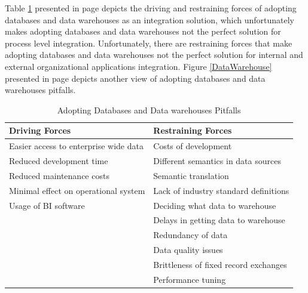 \documentclass[12pt,a4paper,final,twoside,onecolumn,titlepage]{book}
\begin{document}
Table \ref{MT3} presented in page \pageref{MT3} depicts the driving and restraining forces of adopting databases and data warehouses as an integration solution, which unfortunately makes adopting databases and data warehouses not the perfect solution for process level integration. Unfortunately, there are restraining forces that make adopting databases and data warehouses not the perfect solution for internal and external organizational applications integration. Figure \ref{DataWarehouse} presented in page \pageref{DataWarehouse} depicts another view of adopting databases and data warehouses pitfalls.

\begin{table}
\begin{center}
\caption{Adopting Databases and Data warehouses Pitfalls}
\begin{tabularx}{\textwidth}{|X|X|}
\hline Driving Forces & Restraining Forces \\
\hline Easier access to enterprise wide data & Costs of development \\
\hline Reduced development time & Different semantics in data sources \\
\hline Reduced maintenance costs	& Semantic translation \\
\hline Minimal effect on operational system & Lack of industry standard definitions \\
\hline Usage of \gls{BI} software	& Deciding what data to warehouse \\
\hline & Delays in getting data to warehouse \\
\hline & Redundancy of data \\ 
\hline & Data quality issues \\
\hline & Brittleness of fixed record exchanges \\
\hline & Performance tuning \\
\hline
\end{tabularx}
\end{center}
\label{MT3}
\end{table}
\end{document}
